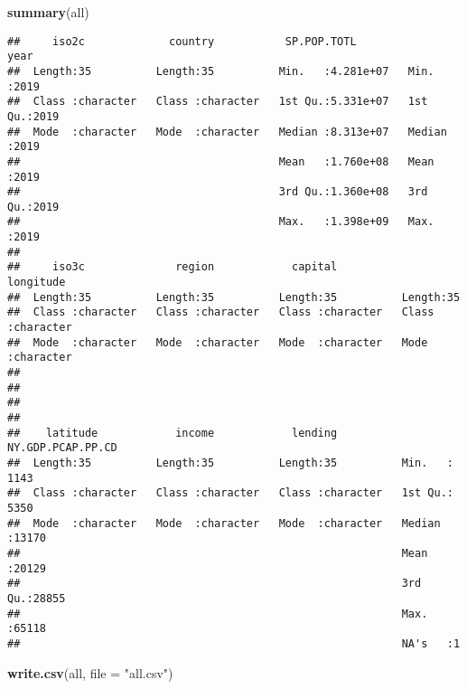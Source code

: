 \documentclass[
]{article}
\newenvironment{Shaded}{\begin{snugshade}}{\end{snugshade}}
\newcommand{\DataTypeTok}[1]{\textcolor[rgb]{0.13,0.29,0.53}{#1}}
\newcommand{\KeywordTok}[1]{\textcolor[rgb]{0.13,0.29,0.53}{\textbf{#1}}}
\newcommand{\NormalTok}[1]{#1}
\newcommand{\StringTok}[1]{\textcolor[rgb]{0.31,0.60,0.02}{#1}}
\begin{document}
\begin{Shaded}
\begin{Highlighting}[]
\KeywordTok{summary}\NormalTok{(all)}
\end{Highlighting}
\end{Shaded}

\begin{verbatim}
##     iso2c             country           SP.POP.TOTL             year     
##  Length:35          Length:35          Min.   :4.281e+07   Min.   :2019  
##  Class :character   Class :character   1st Qu.:5.331e+07   1st Qu.:2019  
##  Mode  :character   Mode  :character   Median :8.313e+07   Median :2019  
##                                        Mean   :1.760e+08   Mean   :2019  
##                                        3rd Qu.:1.360e+08   3rd Qu.:2019  
##                                        Max.   :1.398e+09   Max.   :2019  
##                                                                          
##     iso3c              region            capital           longitude        
##  Length:35          Length:35          Length:35          Length:35         
##  Class :character   Class :character   Class :character   Class :character  
##  Mode  :character   Mode  :character   Mode  :character   Mode  :character  
##                                                                             
##                                                                             
##                                                                             
##                                                                             
##    latitude            income            lending          NY.GDP.PCAP.PP.CD
##  Length:35          Length:35          Length:35          Min.   : 1143    
##  Class :character   Class :character   Class :character   1st Qu.: 5350    
##  Mode  :character   Mode  :character   Mode  :character   Median :13170    
##                                                           Mean   :20129    
##                                                           3rd Qu.:28855    
##                                                           Max.   :65118    
##                                                           NA's   :1
\end{verbatim}

\begin{Shaded}
\begin{Highlighting}[]
\KeywordTok{write.csv}\NormalTok{(all, }\DataTypeTok{file =} \StringTok{"all.csv"}\NormalTok{)}
\end{Highlighting}
\end{Shaded}
\end{document}
